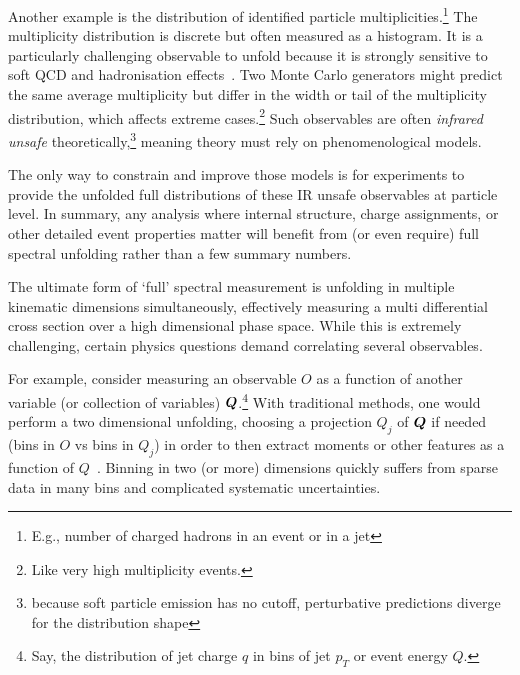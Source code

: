 \begin{description}
            Another example is the distribution of identified particle multiplicities.\footnote{E.g., number of charged hadrons in an event or in a jet}
            The multiplicity distribution is discrete but often measured as a histogram.
            It is a particularly challenging observable to unfold because it is strongly sensitive to soft QCD and hadronisation effects~\cite{Lyons:2011cli, Grosse-Oetringhaus:2009eis, ALICE:2022xip, Segura:2024srj, STAR:2022etb, Carli:2015qta, Skands:2014pea, Christiansen:2015yqa}.
            Two Monte Carlo generators might predict the same average multiplicity but differ in the width or tail of the multiplicity distribution, which affects extreme cases.\footnote{Like very high multiplicity events.}
            Such observables are often \emph{infrared unsafe} theoretically,\footnote{because soft particle emission has no cutoff, perturbative predictions diverge for the distribution shape} meaning theory must rely on phenomenological models.
            
            The only way to constrain and improve those models is for experiments to provide the unfolded full distributions of these IR unsafe observables at particle level.
            In summary, any analysis where internal structure, charge assignments, or other detailed event properties matter will benefit from (or even require) full spectral unfolding rather than a few summary numbers.
        \item[Multidifferential and high dimensional measurements:]
            The ultimate form of `full' spectral measurement is unfolding in multiple kinematic dimensions simultaneously, effectively measuring a multi differential cross section over a high dimensional phase space.
            While this is extremely challenging, certain physics questions demand correlating several observables.
            
            For example, consider measuring an observable $O$ as a function of another variable (or collection of variables) $\vb*Q$.\footnote{Say, the distribution of jet charge $q$ in bins of jet $p_T$ or event energy $Q$.}
            With traditional methods, one would perform a two dimensional unfolding, choosing a projection \(Q_j\) of \(\vb*Q\) if needed (bins in $O$ vs bins in $Q_j$) in order to then extract moments or other features as a function of $Q$~\cite{CMS:2011xqa, ATLAS:2010jvh, ATLAS:2020ccu, CMS:2014eaj, ATLAS:2022zbu, DAgostini:265717}.
            Binning in two (or more) dimensions quickly suffers from sparse data in many bins and complicated systematic uncertainties.
            

\end{description}
